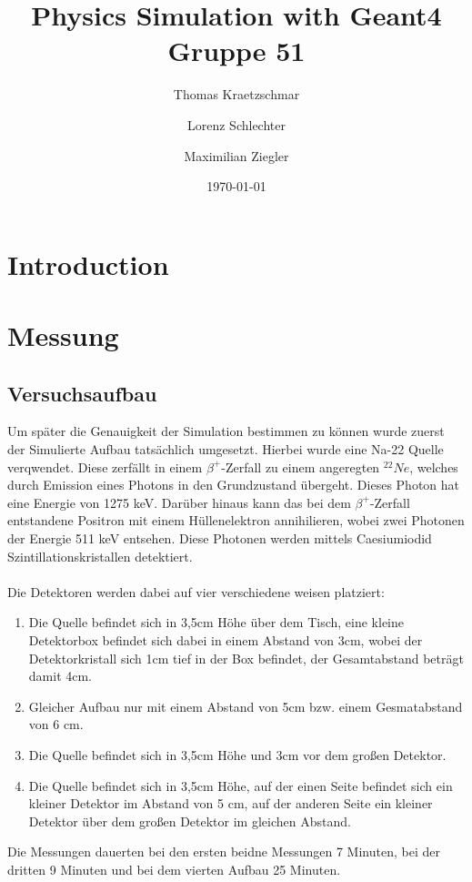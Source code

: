 \documentclass[a4paper,11pt,twoside]{article}
\title{%
{\Huge Physics Simulation with Geant4}\\[0.5\baselineskip]
{\normalsize Gruppe 51}
}
\author{%
Thomas Kraetzschmar
\and Lorenz Schlechter
\and Maximilian Ziegler
}
\date{\today}
\begin{document}
\pagestyle{fancy}
\maketitle
\clearpage
\tableofcontents
\clearpage
\pagestyle{fancy}
\section{Introduction}

\section{Messung}
\subsection{Versuchsaufbau}
Um später die Genauigkeit der Simulation bestimmen zu können wurde zuerst der Simulierte Aufbau tatsächlich umgesetzt. Hierbei wurde eine Na-22 Quelle verqwendet. Diese zerfällt in einem $\beta^+$-Zerfall zu einem angeregten $^{22}Ne$, welches durch Emission eines Photons in den Grundzustand übergeht. Dieses Photon hat eine Energie von 1275 keV. Darüber hinaus kann das bei  dem $\beta^+$-Zerfall entstandene Positron mit einem Hüllenelektron annihilieren, wobei zwei Photonen der Energie 511 keV entsehen.
Diese Photonen werden mittels Caesiumiodid Szintillationskristallen detektiert. \\\\Die Detektoren werden dabei auf vier verschiedene weisen platziert:
\begin{enumerate}
\item Die Quelle befindet sich in 3,5cm Höhe über dem Tisch, eine kleine Detektorbox befindet sich dabei in einem Abstand von 3cm, wobei der Detektorkristall sich 1cm tief in der Box befindet, der Gesamtabstand beträgt damit 4cm.
\item Gleicher Aufbau nur mit einem Abstand von 5cm bzw. einem Gesmatabstand von 6 cm.
\item Die Quelle befindet sich in 3,5cm Höhe und 3cm vor dem großen Detektor.
\item Die Quelle befindet sich in 3,5cm Höhe, auf der einen Seite befindet sich ein kleiner Detektor im Abstand von 5 cm, auf der anderen Seite ein kleiner Detektor über dem großen Detektor im gleichen Abstand.
\end{enumerate}
Die Messungen dauerten bei den ersten beidne Messungen 7 Minuten, bei der dritten 9 Minuten und bei dem vierten Aufbau 25 Minuten.
\end{document}
